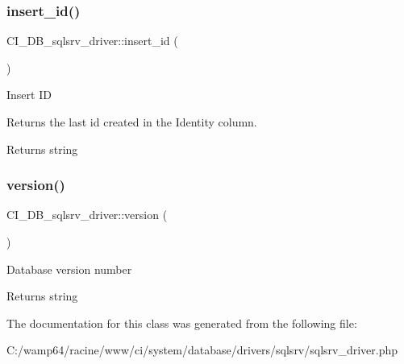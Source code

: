 \subsubsection{\texorpdfstring{insert\+\_\+id()}{insert\_id()}}
{\footnotesize\ttfamily C\+I\+\_\+\+D\+B\+\_\+sqlsrv\+\_\+driver\+::insert\+\_\+id (\begin{DoxyParamCaption}{ }\end{DoxyParamCaption})}

Insert ID

Returns the last id created in the Identity column.

\begin{DoxyReturn}{Returns}
string 
\end{DoxyReturn}
\mbox{\label{class_c_i___d_b__sqlsrv__driver_ae759868ae99445d13ceeeb79c88d0627}} 
\subsubsection{\texorpdfstring{version()}{version()}}
{\footnotesize\ttfamily C\+I\+\_\+\+D\+B\+\_\+sqlsrv\+\_\+driver\+::version (\begin{DoxyParamCaption}{ }\end{DoxyParamCaption})}

Database version number

\begin{DoxyReturn}{Returns}
string 
\end{DoxyReturn}


The documentation for this class was generated from the following file\+:\begin{DoxyCompactItemize}
\item 
C\+:/wamp64/racine/www/ci/system/database/drivers/sqlsrv/sqlsrv\+\_\+driver.\+php\end{DoxyCompactItemize}

